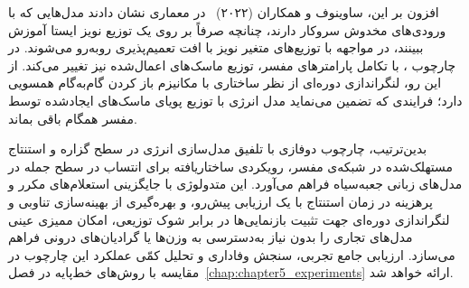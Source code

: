 افزون بر این، ساوینوف و همکاران (۲۰۲۲)~\cite{savinov2022stepunrolled} در معماری  نشان دادند مدل‌هایی که با ورودی‌های مخدوش سروکار دارند، چنانچه صرفاً بر روی یک توزیع نویز ایستا آموزش ببینند، در مواجهه با توزیع‌های متغیر نویز با افت تعمیم‌پذیری روبه‌رو می‌شوند. در چارچوب ، با تکامل پارامترهای مفسر، توزیع ماسک‌های اعمال‌شده نیز تغییر می‌کند. از این رو، لنگراندازی دوره‌ای از نظر ساختاری با مکانیزم باز کردن گام‌به‌گام همسویی دارد؛ فرایندی که تضمین می‌نماید مدل انرژی با توزیع پویای ماسک‌های ایجادشده توسط مفسر همگام باقی بماند.

بدین‌ترتیب، چارچوب دوفازی  با تلفیق مدل‌سازی انرژی در سطح گزاره و استنتاج مستهلک‌شده در شبکه‌ی مفسر، رویکردی ساختاریافته برای انتساب در سطح جمله در مدل‌های زبانی جعبه‌سیاه فراهم می‌آورد. این متدولوژی با جایگزینی استعلام‌های مکرر و پرهزینه در زمان استنتاج با یک ارزیابی پیش‌رو، و بهره‌گیری از بهینه‌سازی تناوبی و لنگراندازی دوره‌ای جهت تثبیت بازنمایی‌ها در برابر شوک توزیعی، امکان ممیزی عینی مدل‌های تجاری را بدون نیاز به‌دسترسی به وزن‌ها یا گرادیان‌های درونی فراهم می‌سازد. ارزیابی جامع تجربی، سنجش وفاداری و تحلیل کمّی عملکرد این چارچوب در مقایسه با روش‌های خط‌پایه در فصل~\ref{chap:chapter5_experiments} ارائه خواهد شد.
